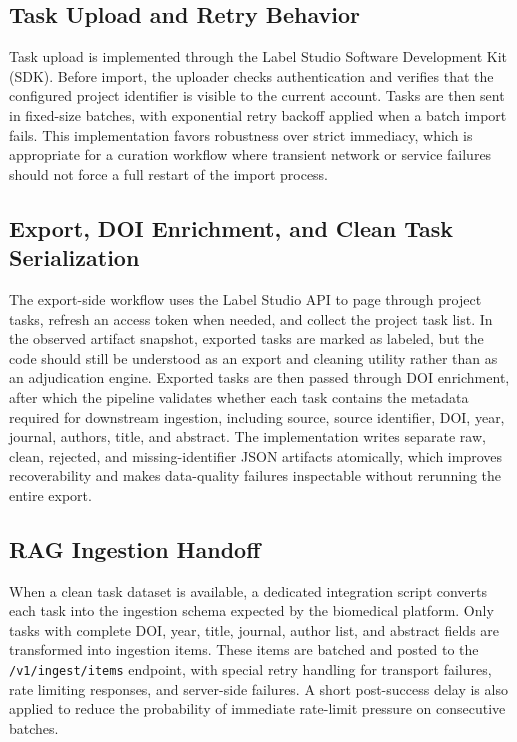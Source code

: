 \subsection{Task Upload and Retry Behavior}

Task upload is implemented through the Label Studio Software Development Kit (SDK). Before import, the uploader checks authentication and verifies that the configured project identifier is visible to the current account. Tasks are then sent in fixed-size batches, with exponential retry backoff applied when a batch import fails. This implementation favors robustness over strict immediacy, which is appropriate for a curation workflow where transient network or service failures should not force a full restart of the import process.

\subsection{Export, DOI Enrichment, and Clean Task Serialization}

The export-side workflow uses the Label Studio API to page through project tasks, refresh an access token when needed, and collect the project task list. In the observed artifact snapshot, exported tasks are marked as labeled, but the code should still be understood as an export and cleaning utility rather than as an adjudication engine. Exported tasks are then passed through DOI enrichment, after which the pipeline validates whether each task contains the metadata required for downstream ingestion, including source, source identifier, DOI, year, journal, authors, title, and abstract. The implementation writes separate raw, clean, rejected, and missing-identifier JSON artifacts atomically, which improves recoverability and makes data-quality failures inspectable without rerunning the entire export.

\subsection{RAG Ingestion Handoff}

When a clean task dataset is available, a dedicated integration script converts each task into the ingestion schema expected by the biomedical platform. Only tasks with complete DOI, year, title, journal, author list, and abstract fields are transformed into ingestion items. These items are batched and posted to the \texttt{/v1/ingest/items} endpoint, with special retry handling for transport failures, rate limiting responses, and server-side failures. A short post-success delay is also applied to reduce the probability of immediate rate-limit pressure on consecutive batches.

